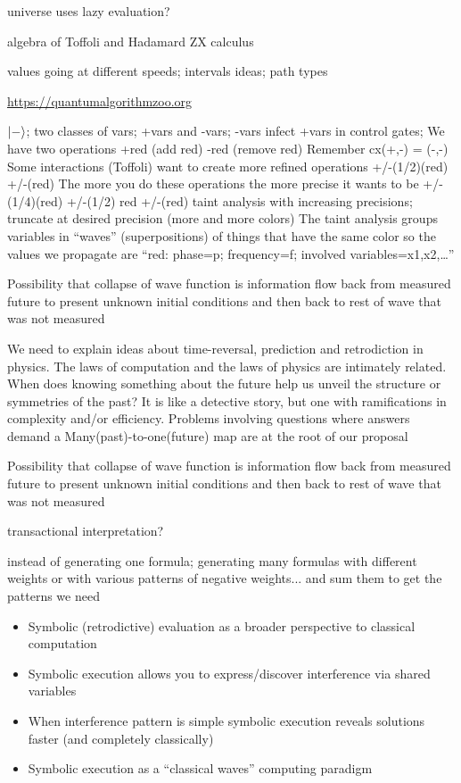 \documentclass{article}
\begin{document}
\begin{refsection}
{universe uses lazy evaluation?

algebra of Toffoli and Hadamard
ZX calculus

values going at different speeds; intervals ideas; path types

\url{https://quantumalgorithmzoo.org}

$\ket{-}$; two classes of vars; +vars and -vars;
-vars infect +vars in control gates;
We have two operations +red (add red) -red (remove red)
Remember cx(+,-) = (-,-)
Some interactions (Toffoli) want to create more refined operations +/-(1/2)(red) +/-(red)
The more you do these operations the more precise it wants to be
  +/-(1/4)(red) +/-(1/2) red +/-(red)
taint analysis with increasing precisions; truncate at desired precision
(more and more colors)
The taint analysis groups variables in “waves” (superpositions) of
things that have the same color so the values we propagate are
“red: phase=p; frequency=f; involved variables={x1,x2,…}”

Possibility that collapse of wave function is information flow back
from measured future to present unknown initial conditions and then
back to rest of wave that was not measured

We need to explain ideas about time-reversal, prediction and retrodiction in 
physics. The laws of computation and the laws of physics are intimately related. 
When does knowing something about the future help us unveil the structure or 
symmetries of the past? It is like a detective story, but one with 
ramifications in complexity and/or efficiency. Problems involving questions 
where answers demand a Many(past)-to-one(future) map are at the root of 
our proposal

Possibility that collapse of wave function is information flow back
from measured future to present unknown initial conditions and then
back to rest of wave that was not measured

transactional interpretation?

instead of generating one formula; generating many formulas with
different weights or with various patterns of negative weights...
and sum them to get the patterns we need

\begin{itemize}
\item Symbolic (retrodictive) evaluation as a broader perspective to classical computation
\item Symbolic execution allows you to express/discover interference via shared variables
\item When interference pattern is simple symbolic execution reveals
  solutions faster (and completely classically)
\item Symbolic execution as a ``classical waves'' computing paradigm
\end{itemize}

}
\end{refsection}
\end{document}
